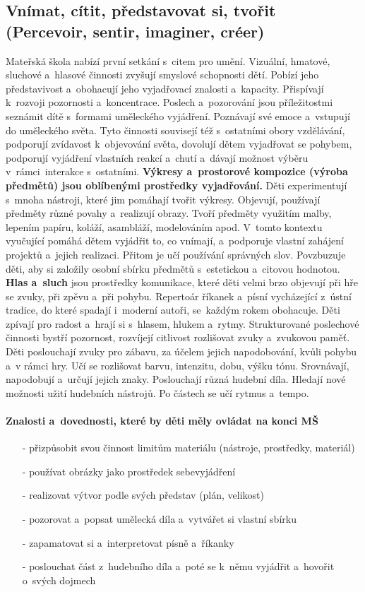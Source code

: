 		\subsection{Vnímat, cítit, představovat si, tvořit (Percevoir, sentir, imaginer, créer)}
			Mateřská škola nabízí první setkání s citem pro umění. Vizuální, hmatové, sluchové a hlasové činnosti zvyšují smyslové schopnosti dětí. Pobízí jeho představivost a~obohacují jeho vyjadřovací znalosti a~kapacity. Přispívají k rozvoji pozornosti a~koncentrace. Poslech a~pozorování jsou příležitostmi seznámit dítě s formami uměleckého vyjádření. Poznávají své emoce a~vstupují do uměleckého světa.
			Tyto činnosti souvisejí též s ostatními obory vzdělávání, podporují zvídavost k objevování světa, dovolují dětem vyjadřovat se pohybem, podporují vyjádření vlastních reakcí a~chutí a~dávají možnost výběru v~rámci interakce s ostatními.
			\textbf{Výkresy a~prostorové kompozice (výroba předmětů) jsou oblíbenými prostředky vyjadřování.}
			Děti experimentují s mnoha nástroji, které jim pomáhají tvořit výkresy. Objevují, používají předměty různé povahy a~realizují obrazy. Tvoří předměty využitím malby, lepením papíru, koláží, asambláží, modelováním apod.
			V tomto kontextu vyučující pomáhá dětem vyjádřit to, co vnímají, a~podporuje vlastní zahájení projektů a~jejich realizaci. Přitom je učí používání správných slov. Povzbuzuje děti, aby si založily osobní sbírku předmětů s estetickou a~citovou hodnotou.
			\textbf{Hlas a~sluch} jsou prostředky komunikace, které děti velmi brzo objevují při hře se zvuky, při zpěvu a~při pohybu.
			Repertoár říkanek a~písní vycházející z ústní tradice, do které spadají i~moderní autoři, se každým rokem obohacuje. Děti zpívají pro radost a~hrají si s hlasem, hlukem a~rytmy.
			Strukturované poslechové činnosti bystří pozornost, rozvíjejí citlivost rozlišovat zvuky a zvukovou paměť. Děti poslouchají zvuky pro zábavu, za účelem jejich napodobování, kvůli pohybu a v rámci hry. Učí se rozlišovat barvu, intenzitu, dobu, výšku tónu. Srovnávají, napodobují a~určují jejich znaky. Poslouchají různá hudební díla. Hledají nové možnosti užití hudebních nástrojů. Po částech se učí rytmus a~tempo. 

			\paragraph{Znalosti a~dovednosti, které by děti měly ovládat na konci MŠ}
				\begin{itemize}
					\setlength\itemsep{-2mm}
					\item[-] přizpůsobit svou činnost limitům materiálu (nástroje, prostředky, materiál)
					\item[-] používat obrázky jako prostředek sebevyjádření
					\item[-] realizovat výtvor podle svých představ (plán, velikost)
					\item[-] pozorovat a~popsat umělecká díla a~vytvářet si vlastní sbírku
					\item[-] zapamatovat si a~interpretovat písně a~říkanky
					\item[-] poslouchat část z hudebního díla a~poté se k němu vyjádřit a~hovořit o~svých dojmech
				\end{itemize}



